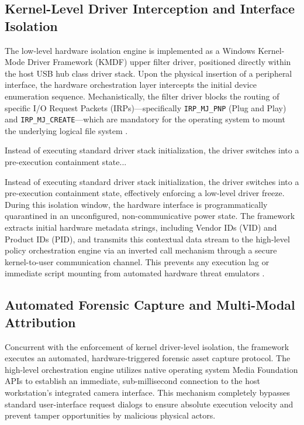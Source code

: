 \documentclass{ieeeaccess}
\begin{document}
\subsection{Kernel-Level Driver Interception and Interface Isolation}
The low-level hardware isolation engine is implemented as a Windows Kernel-Mode Driver Framework (KMDF) upper filter driver, positioned directly within the host USB hub class driver stack. Upon the physical insertion of a peripheral interface, the hardware orchestration layer intercepts the initial device enumeration sequence. Mechanistically, the filter driver blocks the routing of specific I/O Request Packets (IRPs)—specifically \texttt{IRP\_MJ\_PNP} (Plug and Play) and \texttt{IRP\_MJ\_CREATE}—which are mandatory for the operating system to mount the underlying logical file system \cite{ref14}.



Instead of executing standard driver stack initialization, the driver switches into a pre-execution containment state...

Instead of executing standard driver stack initialization, the driver switches into a pre-execution containment state, effectively enforcing a low-level driver freeze. During this isolation window, the hardware interface is programmatically quarantined in an unconfigured, non-communicative power state. The framework extracts initial hardware metadata strings, including Vendor IDs (VID) and Product IDs (PID), and transmits this contextual data stream to the high-level policy orchestration engine via an inverted call mechanism through a secure kernel-to-user communication channel. This prevents any execution lag or immediate script mounting from automated hardware threat emulators \cite{ref15}.

\subsection{Automated Forensic Capture and Multi-Modal Attribution}
Concurrent with the enforcement of kernel driver-level isolation, the framework executes an automated, hardware-triggered forensic asset capture protocol. The high-level orchestration engine utilizes native operating system Media Foundation APIs to establish an immediate, sub-millisecond connection to the host workstation's integrated camera interface. This mechanism completely bypasses standard user-interface request dialogs to ensure absolute execution velocity and prevent tamper opportunities by malicious physical actors.
\end{document}
